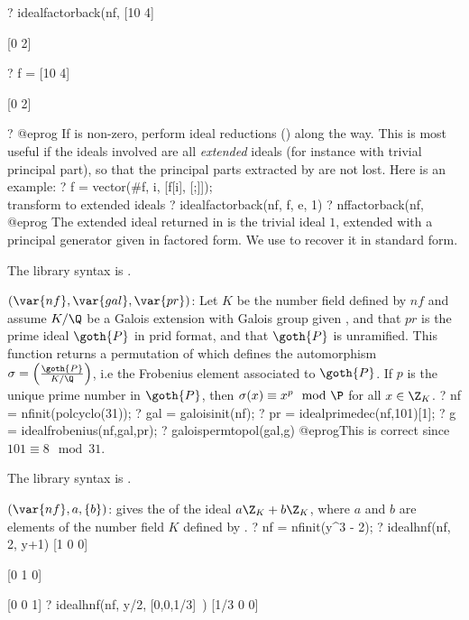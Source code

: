 ? idealfactorback(nf, %
[10 4]

[0  2]

? f = %
[10 4]

[0  2]

? %
@eprog
If  is non-zero, perform ideal reductions () along the
way. This is most useful if the ideals involved are all \emph{extended}
ideals (for instance with trivial principal part), so that the principal parts
extracted by  are not lost. Here is an example:
\bprog
? f = vector(#f, i, [f[i], [;]]);  \\ transform to extended ideals
? idealfactorback(nf, f, e, 1)
? nffactorback(nf, %
@eprog
The extended ideal returned in  is the trivial ideal $1$, extended
with a principal generator given in factored form. We use 
to recover it in standard form.

The library syntax is .

$(\var{nf},\var{gal},\var{pr})$: \label{se:idealfrobenius}Let $K$ be the number field defined by $nf$ and assume $K/\Q$ be a
Galois extension with Galois group given ,
and that $pr$ is the prime ideal $\goth{P}$ in prid format, and that
$\goth{P}$ is unramified.
This function returns a permutation of  which defines the
automorphism $\sigma=\left(\goth{P}\over K/\Q \right)$, i.e the Frobenius
element associated to $\goth{P}$. If $p$ is the unique prime number
in $\goth{P}$, then $\sigma(x)\equiv x^p\mod\P$ for all $x\in\Z_K$.
\bprog
? nf = nfinit(polcyclo(31));
? gal = galoisinit(nf);
? pr = idealprimedec(nf,101)[1];
? g = idealfrobenius(nf,gal,pr);
? galoispermtopol(gal,g)
@eprog\noindent This is correct since $101\equiv 8\mod{31}$.

The library syntax is .

$(\var{nf},a,\{b\})$: \label{se:idealhnf}gives the  of the ideal $a\Z_K+b\Z_K$, where $a$
and $b$ are elements of the number field $K$ defined by .
\bprog
? nf = nfinit(y^3 - 2);
? idealhnf(nf, 2, y+1)
[1 0 0]

[0 1 0]

[0 0 1]
? idealhnf(nf, y/2, [0,0,1/3]~)
[1/3 0 0]


